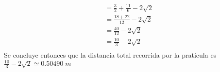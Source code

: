 \begin{align*}
	                                                                                                                                 & =\frac{3}{2}+\frac{11}{6}-2\sqrt{2}                                                                                                                                    \\
	                                                                                                                                 & =\frac{18+22}{12}-2\sqrt{2}\\
	                                                                                                                                 & =\frac{40}{12}-2\sqrt{2}\\
	                                                                                                                                 & =\frac{10}{3}-2\sqrt{2}\\
\end{align*}
Se concluye entonces que la distancia total recorrida por la praticula es $\displaystyle\frac{10}{3}-2\sqrt{2}\simeq 0.50490\;m$